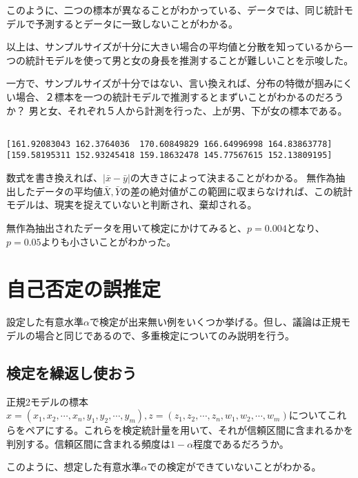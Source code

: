 \fi
{}
このように、二つの標本が異なることがわかっている、データでは、同じ統計モデルで予測するとデータに一致しないことがわかる。
\fi

以上は、サンプルサイズが十分に大きい場合の平均値と分散を知っているから一つの統計モデルを使って男と女の身長を推測することが難しいことを示唆した。


一方で、サンプルサイズが十分ではない、言い換えれば、分布の特徴が掴みにくい場合、２標本を一つの統計モデルで推測するとまずいことがわかるのだろうか？
男と女、それぞれ５人から計測を行った、上が男、下が女の標本である。
\begin{lstlisting}

[161.92083043 162.3764036  170.60849829 166.64996998 164.83863778]
[159.58195311 152.93245418 159.18632478 145.77567615 152.13809195]
\end{lstlisting}



数式を書き換えれば、$|\bar{x}-\bar{y}|$の大きさによって決まることがわかる。
無作為抽出したデータの平均値$\bar{X},\bar{Y}$の差の絶対値がこの範囲に収まらなければ、この統計モデルは、現実を捉えていないと判断され、棄却される。

無作為抽出されたデータを用いて検定にかけてみると、$p=0.004$となり、$p=0.05$よりも小さいことがわかった。
\fi


\section{自己否定の誤推定}
設定した有意水準$\alpha$で検定が出来無い例をいくつか挙げる。但し、議論は正規モデルの場合と同じであるので、多重検定についてのみ説明を行う。
\subsection{検定を繰返し使おう}
正規2モデルの標本$x=(x_1,x_2,\cdots,x_n,y_1,y_2,\cdots,y_m),z=(z_1,z_2,\cdots,z_n,w_1,w_2,\cdots,w_m)$についてこれらをペアにする。これらを検定統計量を用いて、それが信頼区間に含まれるかを判別する。信頼区間に含まれる頻度は$1-\alpha$程度であるだろうか。


このように、想定した有意水準$\alpha$での検定ができていないことがわかる。
